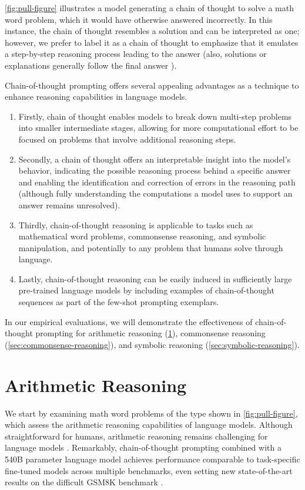 \cref{fig:pull-figure} illustrates a model generating a chain of thought to solve a math word problem, which it would have otherwise answered incorrectly. In this instance, the chain of thought resembles a solution and can be interpreted as one; however, we prefer to label it as a chain of thought to emphasize that it emulates a step-by-step reasoning process leading to the answer (also, solutions or explanations generally follow the final answer \citep[][\textit{inter alia}]{narang2020wt5,wiegreffe2021reframing,lampinen2022can}).

Chain-of-thought prompting offers several appealing advantages as a technique to enhance reasoning capabilities in language models.

\begin{enumerate}[topsep=1pt,itemsep=0ex]
    \item Firstly, chain of thought enables models to break down multi-step problems into smaller intermediate stages, allowing for more computational effort to be focused on problems that involve additional reasoning steps.
    \item Secondly, a chain of thought offers an interpretable insight into the model's behavior, indicating the possible reasoning process behind a specific answer and enabling the identification and correction of errors in the reasoning path (although fully understanding the computations a model uses to support an answer remains unresolved).
    \item Thirdly, chain-of-thought reasoning is applicable to tasks such as mathematical word problems, commonsense reasoning, and symbolic manipulation, and potentially to any problem that humans solve through language.
    \item Lastly, chain-of-thought reasoning can be easily induced in sufficiently large pre-trained language models by including examples of chain-of-thought sequences as part of the few-shot prompting exemplars.
\end{enumerate}

In our empirical evaluations, we will demonstrate the effectiveness of chain-of-thought prompting for arithmetic reasoning (\cref{sec:arithmetic-reasoning}), commonsense reasoning (\cref{sec:commonsense-reasoning}), and symbolic reasoning (\cref{sec:symbolic-reasoning}).

\section{Arithmetic Reasoning}\label{sec:arithmetic-reasoning}
We start by examining math word problems of the type shown in \cref{fig:pull-figure}, which assess the arithmetic reasoning capabilities of language models. Although straightforward for humans, arithmetic reasoning remains challenging for language models \citep[][\textit{inter alia}]{hendrycks2021measuring,patel-etal-2021-nlp}. Remarkably, chain-of-thought prompting combined with a 540B parameter language model achieves performance comparable to task-specific fine-tuned models across multiple benchmarks, even setting new state-of-the-art results on the difficult GSM8K benchmark \citep{cobbe2021training}.

